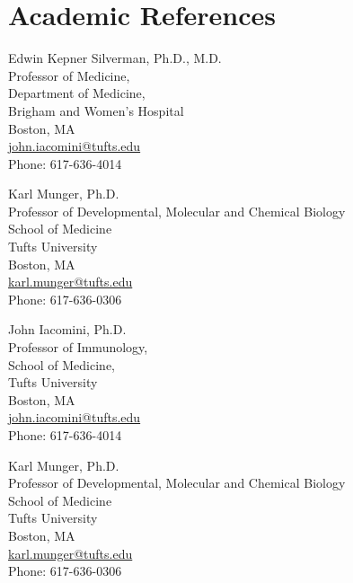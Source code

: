 \documentclass[letterpaper, 10pt]{article}
\begin{document}
\section*{Academic References}

\begin{minipage}[ht]{.50\textwidth}
Edwin Kepner Silverman, Ph.D., M.D. \\
Professor of Medicine, \\
Department of Medicine, \\
Brigham and Women's Hospital \\
Boston, MA \\
\href{mailto:john.iacomini@tufts.edu}{john.iacomini@tufts.edu} \\
Phone: 617-636-4014
\end{minipage}
\begin{minipage}[ht]{.50\textwidth}
Karl Munger, Ph.D. \\
Professor of Developmental, Molecular and Chemical Biology \\
School of Medicine \\
Tufts University \\
Boston, MA \\
\href{mailto:karl.munger@tufts.edu}{karl.munger@tufts.edu} \\
Phone: 617-636-0306
\end{minipage}

\begin{minipage}[ht]{.50\textwidth}
John Iacomini, Ph.D. \\
Professor of Immunology, \\
School of Medicine, \\
Tufts University \\
Boston, MA \\
\href{mailto:john.iacomini@tufts.edu}{john.iacomini@tufts.edu} \\
Phone: 617-636-4014
\end{minipage}
\begin{minipage}[ht]{.50\textwidth}
Karl Munger, Ph.D. \\
Professor of Developmental, Molecular and Chemical Biology \\
School of Medicine \\
Tufts University \\
Boston, MA \\
\href{mailto:karl.munger@tufts.edu}{karl.munger@tufts.edu} \\
Phone: 617-636-0306
\end{minipage}
\end{document}
